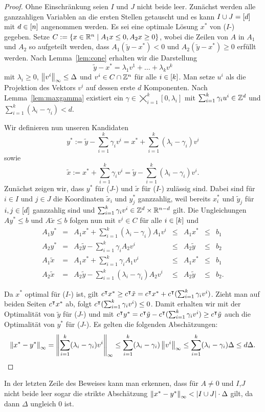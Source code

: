 \begin{proof}
	Ohne Einschränkung seien $I$ und $J$ nicht beide leer.
	Zunächst werden alle ganzzahligen Variablen an die ersten Stellen getauscht und es kann $I\cup J=[d]$ mit $d\in[n]$ angenommen werden.
	Es sei eine optimale Lösung $x^*$ von ($I$-\MIPR) gegeben.
	Setze $C:=\{ x\in\mathbb{R}^n \mid A_1 x \leq 0, A_2x\geq0 \}$, wobei die Zeilen von $A$ in $A_1$ und $A_2$ so aufgeteilt werden, dass $A_1 (\tilde{y}-x^*)<0$ und $A_2 (\tilde{y}-x^*)\geq0$ erfüllt werden.
	Nach Lemma~\ref{lem:cone} erhalten wir die Darstellung 
	$$\tilde{y}-x^* = \lambda_1v^1 + \dots+\lambda_kv^k$$
	mit $\lambda_i\geq0$, $\left\lVert v^i\right\rVert_\infty\leq \Delta$ und $v^i\in C\cap\mathbb{Z}^n$ für alle $i\in[k]$.
	Man setze $u^i$ als die Projektion des Vektors $v^i$ auf dessen erste $d$ Komponenten.
	Nach Lemma~\ref{lem:maxgamma} existiert ein $\gamma\in\bigtimes_{i=1}^k[0,\lambda_i]$ mit  $\sum_{i=1}^k\gamma_iu^i\in\mathbb{Z}^d$ und $\sum_{i=1}^k(\lambda_i -\gamma_i)<d$.
	
	Wir definieren nun unseren Kandidaten $$y^*:=\tilde{y}-\sum_{i=1}^k\gamma_iv^i=x^*+\sum_{i=1}^k(\lambda_i-\gamma_i)v^i$$
	sowie $$\tilde{x}:=x^*+\sum_{i=1}^k\gamma_iv^i=\tilde{y}-\sum_{i=1}^k(\lambda_i-\gamma_i)v^i.$$
	Zunächst zeigen wir, dass $y^*$ für ($J$-\MIPR) und $\tilde{x}$ für ($I$-\MIPR) zulässig sind.
	Dabei sind für $i\in I$ und $j\in J$ die Koordinaten $\tilde{x}_i$ und $y^*_j$ ganzzahlig, weil bereits $x^*_i$ und $\tilde{y}_j$ für $i,j\in[d]$ ganzzahlig sind und $\sum_{i=1}^k\gamma_iv^i\in\mathbb{Z}^d\times\mathbb{R}^{n-d}$ gilt.
	Die Ungleichungen $Ay^*\leq b$ und $A\tilde{x}\leq b$ folgen nun mit $v^i\in C$ für alle $i\in[k]$ und 
	$$
	\begin{array}{lllllll}
	A_1 y^*&=&A_1x^*+\sum_{i=1}^k(\lambda_i-\gamma_i)A_1v^i &\leq& A_1 x^* &\leq&b_1\\
	A_2 y^*&=&A_2\tilde{y}-\sum_{i=1}^k\gamma_iA_2v^i &\leq& A_2\tilde{y} &\leq& b_2\\
	A_1\tilde{x} &=&A_1x^*+\sum_{i=1}^k \gamma_iA_1v^i &\leq& A_1x^* &\leq&b_1\\
	A_2\tilde{x} &=&A_2\tilde{y}-\sum_{i=1}^k(\lambda_i-\gamma_i)A_2v^i&\leq& A_2\tilde{y}&\leq& b_2.
	\end{array}
	$$
	
	Da $x^*$ optimal für ($I$-\MIPR) ist, gilt $c^\intercal x^*\geq c^\intercal \tilde{x} = c^\intercal x^* + c^\intercal (\sum_{i=1}^k\gamma_iv^i)$.
	Zieht man auf beiden Seiten $c^\intercal x^*$ ab, folgt $c^\intercal(\sum_{i=1}^k\gamma_iv^i)\leq0$.
	Damit erhalten wir mit der Optimalität von $\tilde{y}$ für ($J$-\MIPR) und mit 
	$c^\intercal y^*=c^\intercal\tilde{y}-c^\intercal(\sum_{i=1}^k\gamma_iv^i)\geq c^\intercal\tilde{y}$
	auch die Optimalität von $y^*$ für ($J$-\MIPR).
	Es gelten die folgenden Abschätzungen:
	$$\left\lVert x^*-y^*\right\rVert_\infty=\left\lVert\sum_{i=1}^k(\lambda_i-\gamma_i)v^i\right\rVert_\infty\leq \sum_{i=1}^k(\lambda_i-\gamma_i)\left\lVert v^i\right\rVert_\infty\leq \sum_{i=1}^k(\lambda_i-\gamma_i)\Delta\leq d\Delta.
	$$
\end{proof}
\begin{remark}
	In der letzten Zeile des Beweises kann man erkennen, dass für $A\neq 0$ und $I$,$J$ nicht beide leer sogar die strikte Abschätzung $\left\lVert x^*-y^*\right\rVert_\infty<\lvert I\cup J \rvert\cdot\Delta$ gilt, da dann $\Delta$ ungleich $0$ ist.
\end{remark}
